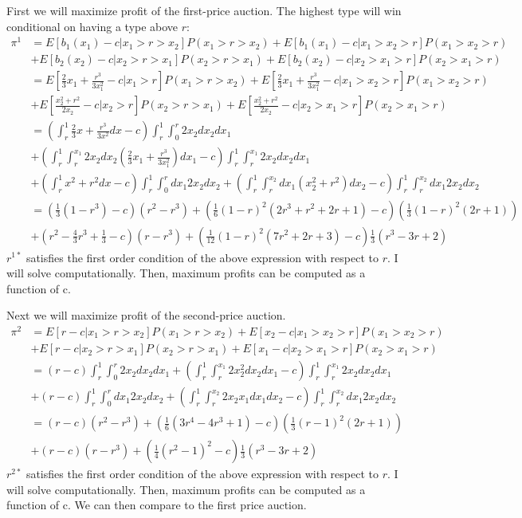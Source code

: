 \documentclass[11pt]{article} %
\begin{document}
First we will maximize profit of the first-price auction. The highest type will win conditional on having a type above $r$:
\begin{align*}
\pi^1 &= E[b_1(x_1) - c| x_1>r>x_2]P(x_1>r>x_2) + E[b_1(x_1) - c| x_1>x_2>r]P(x_1>x_2>r) \\&+ E[b_2(x_2) - c|x_2>r>x_1 ]P(x_2>r>x_1) + E[b_2(x_2) - c|x_2>x_1>r ]P(x_2>x_1>r)\\
&= E\left[ \frac{2}{3}x_1 + \frac{r^3}{3x_1^2} - c| x_1>r\right]P(x_1>r>x_2) + E\left[ \frac{2}{3}x_1 + \frac{r^3}{3x_1^2}- c| x_1>x_2>r\right]P(x_1>x_2>r) \\&+ E\left[ \frac{x_2^2 + r^2}{2x_2}  - c|x_2>r\right]P(x_2>r>x_1) + E\left[ \frac{x_2^2 + r^2}{2x_2} - c|x_2>x_1>r \right]P(x_2>x_1>r)\\
&= \left( \int_{r}^1 \frac{2}{3}x + \frac{r^3}{3x^2} dx - c \right)\int_{r}^1\int_{0}^r 2x_2 dx_2dx_1 \\&+\left(\int_r^1\int_{r}^{x_1} 2x_2dx_2\left( \frac{2}{3}x_1 + \frac{r^3}{3x_1^2}\right) dx_1- c\right) \int_{r}^1\int_{r}^{x_1} 2x_2 dx_2dx_1  \\&+ \left( \int_{r}^1 x^2 + r^2 dx - c \right)\int_{r}^1\int_{0}^r  dx_1 2x_2 dx_2 + \left(\int_r^1\int_{r}^{x_2}  dx_1\left( x_2^2 + r^2\right)dx_2- c\right) \int_{r}^1\int_{r}^{x_2}  dx_1 2x_2 dx_2\\
&= \left( \frac{1}{3}(1-r^3) - c \right)(r^2-r^3) + \left( \frac{1}{6}(1-r)^2(2r^3 + r^2 + 2r +1) - c \right)\left( \frac{1}{3}(1-r)^2(2r+1)\right) \\
&+ \left(r^2 -\frac{4}{3}r^3 +\frac{1}{3} - c \right)(r-r^3) + \left(\frac{1}{12}(1-r)^2(7r^2+2r+3)  - c \right)\frac{1}{3}\left( r^3 - 3r + 2 \right)
\end{align*}
$r^{1*}$ satisfies the first order condition of the above expression with respect to $r$. I will solve computationally. Then, maximum profits can be computed as a function of c.


Next we will maximize profit of the second-price auction. 
\begin{align*}
\pi^2 &=  E[r - c| x_1>r>x_2]P(x_1>r>x_2) + E[x_2 - c| x_1>x_2>r]P(x_1>x_2>r) \\&+ E[r - c|x_2>r>x_1 ]P(x_2>r>x_1) + E[x_1 - c|x_2>x_1>r ]P(x_2>x_1>r) \\
&= (r - c)\int_{r}^1\int_{0}^r 2x_2 dx_2dx_1+ \left( \int_{r}^1 \int_r^{x_1}2x_2^2 dx_2 dx_1 - c \right) \int_{r}^1\int_{r}^{x_1} 2x_2 dx_2dx_1 \\&+ (r - c)\int_{r}^1\int_{0}^r  dx_1 2x_2 dx_2 + \left( \int_{r}^1 \int_r^{x_2}2x_2x_1 dx_1 dx_2 - c \right)\int_{r}^1\int_{r}^{x_2}  dx_1 2x_2 dx_2 \\
&= (r-c)(r^2-r^3) + \left(\frac{1}{6}(3r^4 - 4r^3 + 1) - c \right) \left( \frac{1}{3}(r-1)^2(2r+1) \right) \\ &+ (r-c)(r-r^3) + \left(\frac{1}{4}(r^2-1)^2 - c\right)
\frac{1}{3}(r^3 - 3r + 2)\end{align*}
$r^{2*}$ satisfies the first order condition of the above expression with respect to $r$. I will solve computationally. Then, maximum profits can be computed as a function of c. We can then compare to the first price auction.
\end{document}
